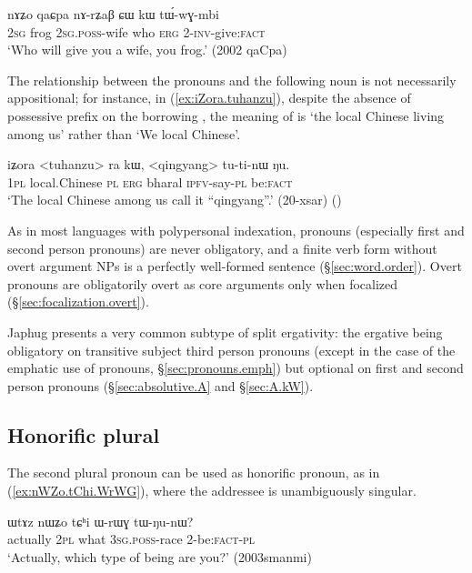 \begin{exe}
\ex  \label{ex:nAZo.qaCpa}
\gll  nɤʑo qaɕpa nɤ-rʑaβ ɕɯ kɯ tɯ́-wɣ-mbi  \\
 \textsc{2sg} frog \textsc{2sg}.\textsc{poss}-wife who \textsc{erg} 2-\textsc{inv}-give:\textsc{fact} \\
\glt `Who will give you a wife, you frog.'   (2002 qaCpa)
\end{exe} 

The relationship between the pronouns and the following noun is not necessarily appositional; for instance, in (\ref{ex:iZora.tuhanzu}), despite the absence of possessive prefix on the borrowing , the meaning of  is `the local Chinese living among us' rather than `We local Chinese'.

\begin{exe}
\ex \label{ex:iZora.tuhanzu}
\gll iʑora <tuhanzu> ra kɯ, <qingyang> tu-ti-nɯ ŋu. \\
\textsc{1pl} local.Chinese \textsc{pl} \textsc{erg} bharal \textsc{ipfv}-say-\textsc{pl} be:\textsc{fact} \\
\glt `The local Chinese among us call it ``qingyang''.' (20-xsar)
()
\end{exe} 

As in most languages with polypersonal indexation, pronouns (especially first and second person pronouns) are never obligatory, and a finite verb form without overt argument NPs is a perfectly well-formed sentence (§\ref{sec:word.order}). Overt pronouns are obligatorily overt as core arguments only when focalized (§\ref{sec:focalization.overt}).

Japhug presents a very common subtype of split ergativity: the ergative  being obligatory on transitive subject third person pronouns (except in the case of the emphatic use of pronouns, §\ref{sec:pronouns.emph}) but optional on first and second person pronouns (§\ref{sec:absolutive.A} and §\ref{sec:A.kW}).

\subsection{Honorific plural} \label{sec:honorific.pronouns}
The second plural pronoun  can be used as  honorific pronoun, as in (\ref{ex:nWZo.tChi.WrWG}), where the addressee is unambiguously singular.

\begin{exe}
\ex \label{ex:nWZo.tChi.WrWG}
\gll ɯtɤz nɯʑo tɕʰi ɯ-rɯɣ tɯ-ŋu-nɯ? \\
actually \textsc{2pl} what \textsc{3sg}.\textsc{poss}-race 2-be:\textsc{fact}-\textsc{pl} \\
\glt `Actually, which type of being are you?' (2003smanmi)
\end{exe}

